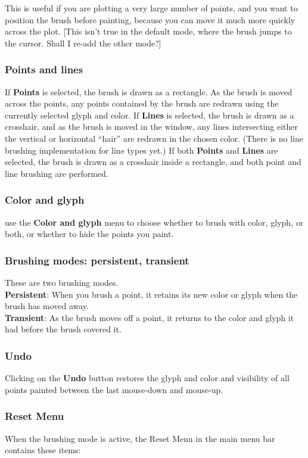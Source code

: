 \documentclass[11pt]{article}
\begin{document}
This is useful if you are plotting a very large number of points,
and you want to position the brush before painting, because you
can move it much more quickly across the plot.  [This isn't true
in the default mode, where the brush jumps to the cursor.  Shall
I re-add the other mode?]

%
\subsubsection{Points and lines}
If {\bf Points} is selected, the brush is drawn as a rectangle.
As the brush is moved across the points, any points contained by
the brush are redrawn using the currently selected glyph and color.
If {\bf Lines} is selected, the brush is drawn as a crosshair, and
as the brush is moved in the window, any lines intersecting either
the vertical or horizontal ``hair'' are redrawn in the chosen color.
(There is no line brushing implementation for line types yet.)
If both {\bf Points} and {\bf Lines} are
selected, the brush is drawn as a crosshair inside a rectangle,
and both point and line brushing are performed.

\subsubsection{Color and glyph}
%
use the {\bf Color and glyph} menu to choose whether to brush
with color, glyph, or both, or whether to hide the points you
paint.

%
\subsubsection{Brushing modes:  persistent, transient}
%
These are two brushing modes.
\medskip
\noindent
\\{\bf Persistent}:  When you brush a point, it retains its new color or glyph
when the brush has moved away.
\\{\bf Transient}:  As the brush moves off a point, it returns to the color and
glyph it had before the brush covered it.

\subsubsection{Undo}
%
Clicking on the {\bf Undo} button restores the glyph and color and
visibility of all points painted between the last mouse-down and
mouse-up.

\subsubsection{Reset Menu}
%
When the brushing mode is active, the Reset Menu in the main
menu bar contains these items:
\end{document}
